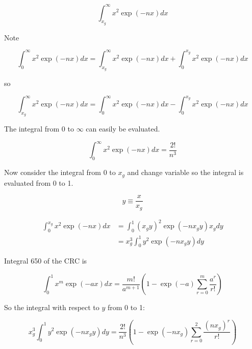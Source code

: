 \documentclass[letterpaper,12pt]{article}
\begin{document}
\begin{equation} \label{eq:08}
\int_{x_{g}}^{\infty} x^{2} \exp(-nx) dx
\end{equation}

Note

\begin{equation} \label{eq:09}
\int_{0}^{\infty} x^{2} \exp(-nx) dx = \int_{x_{g}}^{\infty} x^{2} \exp(-nx) dx + \int_{0}^{x_{g}} x^{2} \exp(-nx) dx
\end{equation}

\noindent so

\begin{equation} \label{eq:10}
\int_{x_{g}}^{\infty} x^{2} \exp(-nx) dx = \int_{0}^{\infty} x^{2} \exp(-nx) dx - \int_{0}^{x_{g}} x^{2} \exp(-nx) dx
\end{equation}

The integral from 0 to $\infty$ can easily be evaluated.

\begin{equation} \label{eq:11}
\int_{0}^{\infty} x^{2} \exp(-nx) dx = \frac{2!}{n^{3}}
\end{equation}

Now consider the integral from 0 to $x_{g}$ and change variable so the integral is evaluated from 0 to 1.

\begin{equation} \label{eq:12}
y \equiv \frac{x}{x_{g}}
\end{equation}

\begin{align} \label{eq:13}
\int_{0}^{x_{g}} x^{2} \exp(-nx) dx &= \int_{0}^{1} (x_{g}y)^{2} \exp(-nx_{g}y) x_{g} dy \\
 &= x_{g}^{3} \int_{0}^{1} y^{2} \exp(-nx_{g}y) dy
\end{align}

Integral 650 of the CRC \cite{} is

\begin{equation} \label{eq:14}
\int_{0}^{1} x^{m} \exp(-ax) dx = \frac{m!}{a^{m+1}} \left( 1 - \exp(-a) \sum_{r = 0}^{m} \frac{a^{r}}{r!} \right)
\end{equation}

So the integral with respect to $y$ from 0 to 1:

\begin{equation} \label{eq:15}
x_{g}^{3} \int_{0}^{1} y^{2} \exp(-nx_{g}y) dy = \frac{2!}{n^{3}} \left( 1 - \exp(-nx_{g}) \sum_{r = 0}^{2} \frac{ (nx_{g})^{r} }{r!} \right)
\end{equation}
\end{document}
